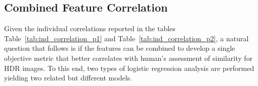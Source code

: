 

\subsection{Combined Feature Correlation}

Given the individual correlations reported in the tables Table~\ref{tab:ind_correlation_p1} and Table~\ref{tab:ind_correlation_p2}, a natural question that follows is if the features can be combined to develop a single objective metric that better correlates with human’s assessment of similarity for HDR images. To this end, two types of logistic regression analysis are performed yielding two related but different models.

